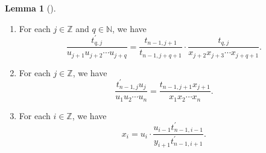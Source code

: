 \documentclass[numbers=enddot,12pt,final,onecolumn,notitlepage]{scrartcl}%
\theoremstyle{definition}
\newtheorem{lem}[theo]{Lemma}
\newenvironment{lemma}[1][]
{\begin{lem}[#1]\begin{leftbar}}
{\end{leftbar}\end{lem}}
\begin{document}
\begin{lemma}
\begin{enumerate}
\item[\textbf{(i)}] For each $j\in\mathbb{Z}$ and $q\in\mathbb{N}$, we have%
\[
\dfrac{t_{q,j}^{\prime}}{u_{j+1}u_{j+2}\cdots u_{j+q}}=\dfrac{t_{n-1,j+1}%
}{t_{n-1,j+q+1}}\cdot\dfrac{t_{q,j}}{x_{j+2}x_{j+3}\cdots x_{j+q+1}}.
\]


\item[\textbf{(j)}] For each $j\in\mathbb{Z}$, we have%
\[
\dfrac{t_{n-1,j}^{\prime}u_{j}}{u_{1}u_{2}\cdots u_{n}}=\dfrac{t_{n-1,j+1}%
x_{j+1}}{x_{1}x_{2}\cdots x_{n}}.
\]


\item[\textbf{(k)}] For each $i\in\mathbb{Z}$, we have%
\[
x_{i}=u_{i}\cdot\dfrac{u_{i-1}t_{n-1,i-1}^{\prime}}{y_{i+1}t_{n-1,i+1}%
^{\prime}}.
\]

\end{enumerate}
\end{lemma}
\end{document}
